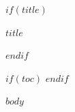 \documentclass[$if(fontsize)$$fontsize$$else$11pt$endif$]{article}
\begin{document}
$if(title)$
\begin{center}
{\LARGE\bfseries $title$}
\end{center}
\vspace{1em}
$endif$

$if(toc)$
\tableofcontents
\newpage
$endif$

$body$
\end{document}
